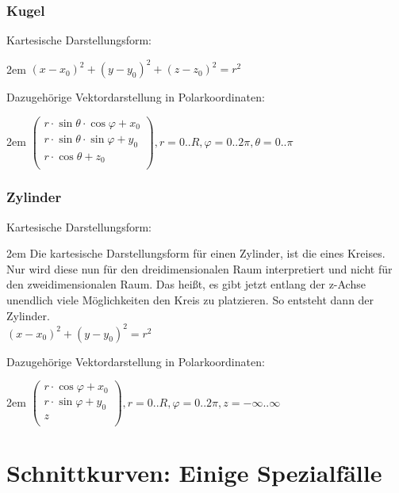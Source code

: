 \documentclass[11pt,final]{scrreprt}
\begin{document}
\subsubsection{Kugel}

Kartesische Darstellungsform:

\begingroup
\leftskip2em 
$ (x-x_0)^2+(y-y_0)^2+(z-z_0)^2 = r^2 $\\
\par	
\endgroup

Dazugehörige Vektordarstellung in Polarkoordinaten:

\begingroup
\leftskip2em 
$ \left( \begin{matrix}
r\cdot\sin\theta\cdot\cos\varphi+x_0\\r\cdot\sin\theta\cdot\sin\varphi+y_0\\r\cdot\cos\theta+z_0\\
\end{matrix} \right), r=0..R, \varphi=0..2\pi, \theta=0..\pi $
\par	
\endgroup

\subsubsection{Zylinder}

Kartesische Darstellungsform:

\begingroup
\leftskip2em 
Die kartesische Darstellungsform für einen Zylinder, ist die eines Kreises. Nur wird diese nun für den dreidimensionalen Raum interpretiert und nicht für den zweidimensionalen Raum. Das heißt, es gibt jetzt entlang der z-Achse unendlich viele Möglichkeiten den Kreis zu platzieren. So entsteht dann der Zylinder.\\
$ (x-x_0)^2+(y-y_0)^2 = r^2 $\\
\par	
\endgroup

Dazugehörige Vektordarstellung in Polarkoordinaten:

\begingroup
\leftskip2em 
$ \left( \begin{matrix}
r\cdot\cos\varphi+x_0\\r\cdot\sin\varphi+y_0\\z\\
\end{matrix} \right), r=0..R, \varphi=0..2\pi, z=-\infty..\infty $
\par	
\endgroup

\section{Schnittkurven: Einige Spezialfälle}
\end{document}
